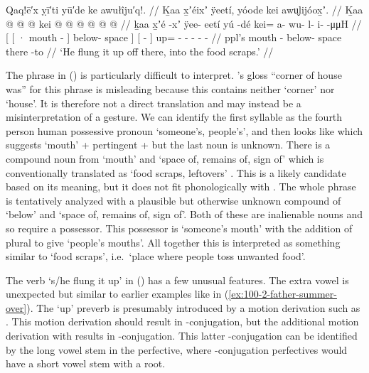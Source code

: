 \ex\label{ex:100-12-flung-up-off}%
%
\begingl
	\glpreamble	Qaq!ē′x ỵī′ti yū′de ke awułîju′q!. //
	\glpreamble	Ḵaa x̱ʼéixʼ ÿeetí, yóode kei awu̬lijóox̱ʼ. //
	\gla	{} {} Ḵaa  @ {} {}  @ {} {} 
			{}  @ {} {}
			kei @  @ {} @ {} @ {} @ {} @ {} //
	\glb	{} {} ḵaa x̱ʼé -xʼ {} ÿee- eetí {}
			{} yú -dé {}
			kei= a- wu- l- i-  -μμH //
	\glc	{}[\pr{DP} {}[ · mouth - {}] below- space {}]
			{}[  - {}]
			up= - - - -  - //
	\gld	{} {} ppl’s mouth - {} below- space {}
			{} there -to {}
			 {} {} {} {} {} {} //
	\glft	‘He flung it up off there, into the food scraps.’
		//
\endgl
\xe

The phrase  in (\lastx) is particularly difficult to interpret.
\citeauthor{swanton:1911}’s gloss “corner of house was” for this phrase is misleading because this contains neither  ‘corner’ nor  ‘house’.
It is therefore not a direct translation and may instead be a misinterpretation of a gesture.  We can identify the first syllable as the fourth person human possessive pronoun  ‘someone’s, people’s’, and then  looks like  which suggests  ‘mouth’ +  pertingent +  but the last noun is unknown.
There is a compound noun  from  ‘mouth’ and  ‘space of, remains of, sign of’ which is conventionally translated as ‘food scraps, leftovers’ \parencite[02/248]{leer:1973}.
This is a likely candidate based on its meaning, but it does not fit phonologically with .
The whole phrase is tentatively analyzed with a plausible but otherwise unknown compound of  ‘below’ and  ‘space of, remains of, sign of’.
Both of these are inalienable nouns and so require a possessor.
This possessor is  ‘someone’s mouth’ with the addition of plural  to give ‘people’s mouths’.
All together this is interpreted as something similar to  ‘food scraps’, i.e.\ ‘place where people toss unwanted food’.

The verb  ‘s/he flung it up’ in (\lastx) has a few unusual features.
The extra vowel is unexpected but similar to earlier examples like in (\ref{ex:100-2-father-summer-over}).
The  ‘up’ preverb is presumably introduced by a motion derivation such as .
This motion derivation should result in -conjugation, but the additional motion derivation with  results in -conjugation.
This latter -conjugation can be identified by the long vowel  stem in the perfective, where -conjugation perfectives would have a short vowel  stem with a  root.

